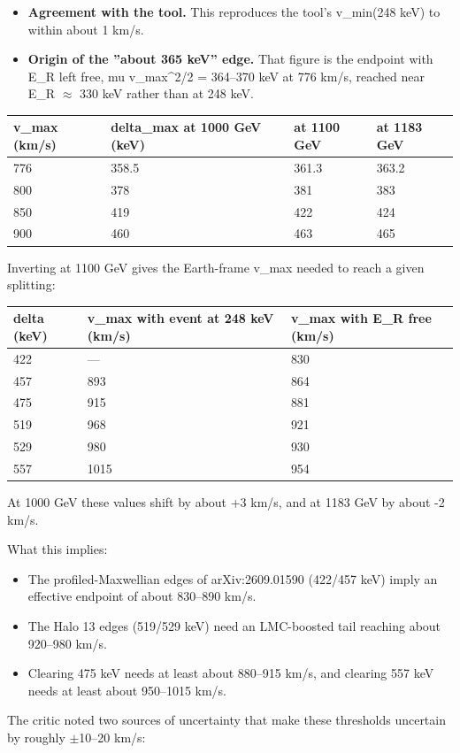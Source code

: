 \documentclass[11pt,a4paper]{article}
\begin{document}
\begin{itemize}
  \item \textbf{Agreement with the tool.} This reproduces the tool's v\_min(248 keV) to within about 1 km/s.
  \item \textbf{Origin of the ''about 365 keV'' edge.} That figure is the endpoint with E\_R left free, mu v\_max\textasciicircum{}2/2 = 364--370 keV at 776 km/s, reached near E\_R $\approx$ 330 keV rather than at 248 keV.
\end{itemize}
\begin{longtable}{@{}p{}p{}p{}p{}@{}}
\toprule
\textbf{v\_max (km/s)} & \textbf{delta\_max at 1000 GeV (keV)} & \textbf{at 1100 GeV} & \textbf{at 1183 GeV} \\ \midrule \endhead
776 & 358.5 & 361.3 & 363.2 \\
800 & 378 & 381 & 383 \\
850 & 419 & 422 & 424 \\
900 & 460 & 463 & 465 \\
\bottomrule\end{longtable}
Inverting at 1100 GeV gives the Earth-frame v\_max needed to reach a given splitting:

\begin{longtable}{@{}p{}p{}p{}@{}}
\toprule
\textbf{delta (keV)} & \textbf{v\_max with event at 248 keV (km/s)} & \textbf{v\_max with E\_R free (km/s)} \\ \midrule \endhead
422 & --- & 830 \\
457 & 893 & 864 \\
475 & 915 & 881 \\
519 & 968 & 921 \\
529 & 980 & 930 \\
557 & 1015 & 954 \\
\bottomrule\end{longtable}
At 1000 GeV these values shift by about +3 km/s, and at 1183 GeV by about -2 km/s.

What this implies:

\begin{itemize}
  \item The profiled-Maxwellian edges of arXiv:2609.01590 (422/457 keV) imply an effective endpoint of about 830--890 km/s.
  \item The Halo 13 edges (519/529 keV) need an LMC-boosted tail reaching about 920--980 km/s.
  \item Clearing 475 keV needs at least about 880--915 km/s, and clearing 557 keV needs at least about 950--1015 km/s.
\end{itemize}
The critic noted two sources of uncertainty that make these thresholds uncertain by roughly $\pm$10--20 km/s:
\end{document}
